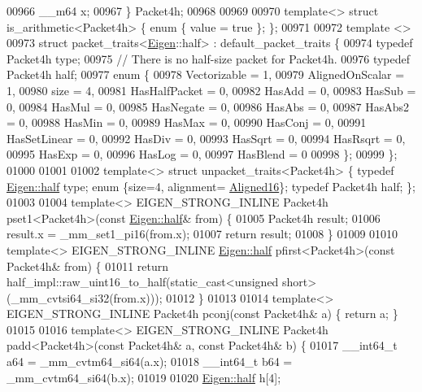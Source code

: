 \begin{DoxyCode}
00966   \_\_m64 x;
00967 \} Packet4h;
00968 
00969 
00970 \textcolor{keyword}{template}<> \textcolor{keyword}{struct }is\_arithmetic<Packet4h> \{ \textcolor{keyword}{enum} \{ value = \textcolor{keyword}{true} \}; \};
00971 
00972 \textcolor{keyword}{template} <>
00973 \textcolor{keyword}{struct }packet\_traits<\hyperlink{namespace_eigen}{Eigen}::half> : default\_packet\_traits \{
00974   \textcolor{keyword}{typedef} Packet4h type;
00975   \textcolor{comment}{// There is no half-size packet for Packet4h.}
00976   \textcolor{keyword}{typedef} Packet4h half;
00977   \textcolor{keyword}{enum} \{
00978     Vectorizable = 1,
00979     AlignedOnScalar = 1,
00980     size = 4,
00981     HasHalfPacket = 0,
00982     HasAdd    = 0,
00983     HasSub    = 0,
00984     HasMul    = 0,
00985     HasNegate = 0,
00986     HasAbs    = 0,
00987     HasAbs2   = 0,
00988     HasMin    = 0,
00989     HasMax    = 0,
00990     HasConj   = 0,
00991     HasSetLinear = 0,
00992     HasDiv = 0,
00993     HasSqrt = 0,
00994     HasRsqrt = 0,
00995     HasExp = 0,
00996     HasLog = 0,
00997     HasBlend = 0
00998   \};
00999 \};
01000 
01001 
01002 \textcolor{keyword}{template}<> \textcolor{keyword}{struct }unpacket\_traits<Packet4h> \{ \textcolor{keyword}{typedef} \hyperlink{struct_eigen_1_1half}{Eigen::half} type; \textcolor{keyword}{enum} \{size=4, alignment=
      \hyperlink{group__enums_gga45fe06e29902b7a2773de05ba27b47a1af8e2bf74b04c02199f62c5e3c06dbfcc}{Aligned16}\}; \textcolor{keyword}{typedef} Packet4h half; \};
01003 
01004 \textcolor{keyword}{template}<> EIGEN\_STRONG\_INLINE Packet4h pset1<Packet4h>(\textcolor{keyword}{const} \hyperlink{struct_eigen_1_1half}{Eigen::half}& from) \{
01005   Packet4h result;
01006   result.x = \_mm\_set1\_pi16(from.x);
01007   \textcolor{keywordflow}{return} result;
01008 \}
01009 
01010 \textcolor{keyword}{template}<> EIGEN\_STRONG\_INLINE \hyperlink{struct_eigen_1_1half}{Eigen::half} pfirst<Packet4h>(\textcolor{keyword}{const} Packet4h& from) \{
01011   \textcolor{keywordflow}{return} half\_impl::raw\_uint16\_to\_half(static\_cast<unsigned short>(\_mm\_cvtsi64\_si32(from.x)));
01012 \}
01013 
01014 \textcolor{keyword}{template}<> EIGEN\_STRONG\_INLINE Packet4h pconj(\textcolor{keyword}{const} Packet4h& a) \{ \textcolor{keywordflow}{return} a; \}
01015 
01016 \textcolor{keyword}{template}<> EIGEN\_STRONG\_INLINE Packet4h padd<Packet4h>(\textcolor{keyword}{const} Packet4h& a, \textcolor{keyword}{const} Packet4h& b) \{
01017   \_\_int64\_t a64 = \_mm\_cvtm64\_si64(a.x);
01018   \_\_int64\_t b64 = \_mm\_cvtm64\_si64(b.x);
01019 
01020   \hyperlink{struct_eigen_1_1half}{Eigen::half} h[4];

\end{DoxyCode}
